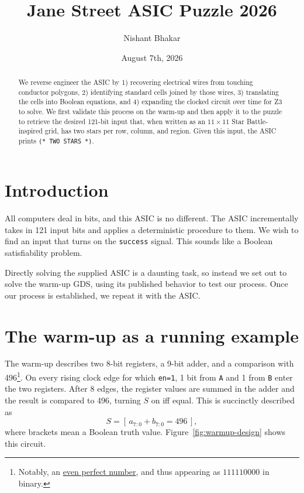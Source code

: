 \documentclass[11pt]{article}
\title{Jane Street ASIC Puzzle 2026}
\author{Nishant Bhakar}
\date{August 7th, 2026}
\begin{document}
\maketitle

\begin{abstract}
We reverse engineer the ASIC by 1) recovering electrical wires from touching conductor polygons, 2) identifying standard cells joined by those wires, 3) translating the cells into Boolean equations, and 4) expanding the clocked circuit over time for Z3 to solve. We first validate this process on the warm-up and then apply it to the puzzle to retrieve the desired 121-bit input that, when written as an $11\times11$ Star Battle-inspired grid, has two stars per row, column, and region. Given this input, the ASIC prints \texttt{(* TWO STARS *)}.
\end{abstract}

\section{Introduction}

All computers deal in bits, and this ASIC is no different. The ASIC incrementally takes in 121 input bits and applies a deterministic procedure to them. We wish to find an input that turns on the \texttt{success} signal. This sounds like a Boolean satisfiability problem.

Directly solving the supplied ASIC is a daunting task, so instead we set out to solve the warm-up GDS, using its published behavior to test our process. Once our process is established, we repeat it with the ASIC.

\section{The warm-up as a running example}

The warm-up describes two 8-bit registers, a 9-bit adder, and a comparison with 496\footnote{Notably, an \href{https://en.wikipedia.org/wiki/Perfect_number\#Even_perfect_numbers}{even perfect number}, and thus appearing as $111110000$ in binary.}. On every rising clock edge for which \texttt{en=1}, 1 bit from \texttt{A} and 1 from \texttt{B} enter the two registers. After 8 edges, the register values are summed in the adder and the result is compared to 496, turning $S$ on iff equal. This is succinctly described as
\[
  S = [\,a_{7:0}+b_{7:0}=496\,],
\]
where brackets mean a Boolean truth value. Figure~\ref{fig:warmup-design} shows this circuit.
\end{document}
